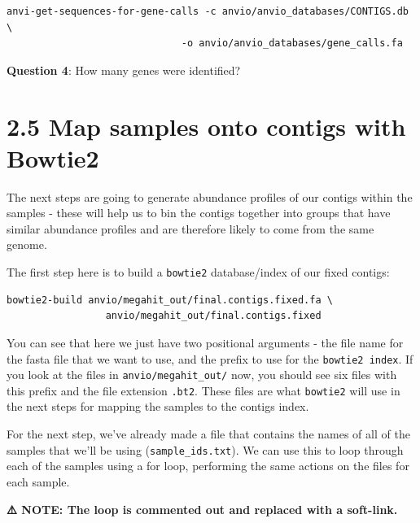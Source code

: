 \documentclass[
]{book}
\begin{document}
\begin{verbatim}
anvi-get-sequences-for-gene-calls -c anvio/anvio_databases/CONTIGS.db \
                              -o anvio/anvio_databases/gene_calls.fa
\end{verbatim}

\textbf{Question 4}: How many genes were identified?

\section{2.5 Map samples onto contigs with Bowtie2}\label{map-samples-onto-contigs-with-bowtie2}

The next steps are going to generate abundance profiles of our contigs within the samples - these will help us to bin the contigs together into groups that have similar abundance profiles and are therefore likely to come from the same genome.

The first step here is to build a \texttt{bowtie2} database/index of our fixed contigs:

\begin{verbatim}
bowtie2-build anvio/megahit_out/final.contigs.fixed.fa \
                 anvio/megahit_out/final.contigs.fixed
\end{verbatim}

You can see that here we just have two positional arguments - the file name for the fasta file that we want to use, and the prefix to use for the \texttt{bowtie2\ index}. If you look at the files in \texttt{anvio/megahit\_out/} now, you should see six files with this prefix and the file extension \texttt{.bt2}. These files are what \texttt{bowtie2} will use in the next steps for mapping the samples to the contigs index.

For the next step, we've already made a file that contains the names of all of the samples that we'll be using (\texttt{sample\_ids.txt}). We can use this to loop through each of the samples using a for loop, performing the same actions on the files for each sample.

\textbf{⚠️ NOTE: The loop is commented out and replaced with a soft-link.}
\end{document}
